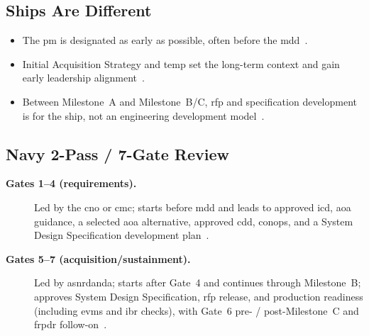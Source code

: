 \documentclass[../main.tex]{subfiles}
\begin{document}
\subsection{Ships Are Different}
\begin{itemize}
  \item The \ac{pm} is designated as early as possible, often before the \ac{mdd}~\autocite{SECNAV5000-2G,edo-3-3-2-acq-milestones-phases-2025}.
  \item Initial Acquisition Strategy and \ac{temp} set the long-term context and gain early leadership alignment~\autocite{DoDI5000-85,SECNAV5000-2G,edo-3-3-2-acq-milestones-phases-2025}.
  \item Between Milestone~A and Milestone~B/C, \ac{rfp} and specification development is for the ship, not an engineering development model~\autocite{SECNAV5000-2G,edo-3-3-2-acq-milestones-phases-2025}.
\end{itemize}

\subsection{Navy 2-Pass / 7-Gate Review}
\begin{description}
  \item[\textbf{Gates 1--4 (requirements).}] Led by the \ac{cno} or \ac{cmc}; starts before \ac{mdd} and leads to approved \ac{icd}, \ac{aoa} guidance, a selected \ac{aoa} alternative, approved \ac{cdd}, \ac{conops}, and a System Design Specification development plan~\autocite{SECNAV5000-2G,edo-3-3-2-acq-milestones-phases-2025}.
  \item[\textbf{Gates 5--7 (acquisition/sustainment).}] Led by \ac{asnrdanda}; starts after Gate~4 and continues through Milestone~B; approves System Design Specification, \ac{rfp} release, and production readiness (including \ac{evms} and \ac{ibr} checks), with Gate~6 pre- / post-Milestone~C and \ac{frpdr} follow-on~\autocite{SECNAV5000-2G,edo-3-3-2-acq-milestones-phases-2025}.
\end{description}
\end{document}
